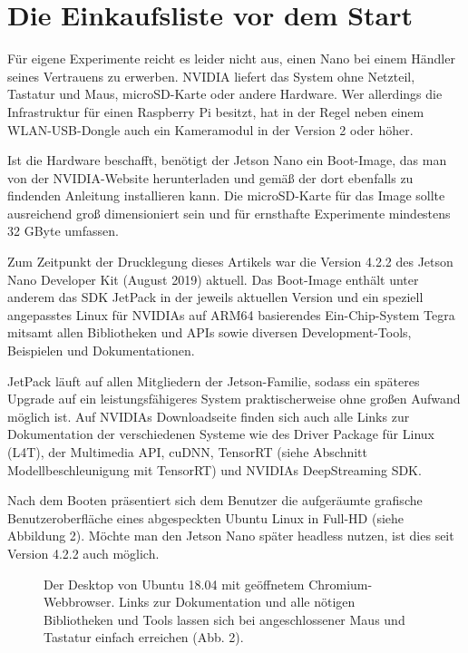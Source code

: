 \section{Die Einkaufsliste vor dem Start}

Für eigene Experimente reicht es leider nicht aus, einen Nano bei einem Händler seines Vertrauens zu erwerben. NVIDIA liefert das System ohne Netzteil, Tastatur und Maus, microSD-Karte oder andere Hardware. Wer allerdings die Infrastruktur für einen Raspberry Pi besitzt, hat in der Regel neben einem WLAN-USB-Dongle auch ein Kameramodul in der Version 2 oder höher. 

Ist die Hardware beschafft, benötigt der Jetson Nano ein Boot-Image, das man von der NVIDIA-Website herunterladen und gemäß der dort ebenfalls zu findenden Anleitung installieren kann. Die ­microSD-Karte für das Image sollte aus­reichend groß dimensioniert sein und für ernsthafte Experimente mindestens 32 GByte umfassen. 

Zum Zeitpunkt der Drucklegung dieses Artikels war die Version 4.2.2 des Jetson Nano Developer Kit (August 2019) aktuell. Das Boot-Image enthält unter anderem das SDK JetPack in der jeweils aktuellen Version und ein speziell angepasstes Linux für NVIDIAs auf ARM64 basierendes Ein-Chip-System Tegra mitsamt allen Bibliotheken und APIs sowie diversen Development-Tools, Beispielen und Dokumentationen. 

JetPack läuft auf allen Mitgliedern der Jetson-Familie, sodass ein späteres Upgrade auf ein leistungsfähigeres System praktischerweise ohne großen Aufwand möglich ist. Auf NVIDIAs Downloadseite finden sich auch alle Links zur Dokumentation der verschiedenen Systeme wie des Driver Package für Linux (L4T), der Multimedia API, cuDNN, TensorRT (siehe Abschnitt \glqq Modellbeschleunigung mit TensorRT\grqq) und NVIDIAs DeepStreaming SDK. 

Nach dem Booten präsentiert sich dem Benutzer die aufgeräumte grafische Benutzeroberfläche eines abgespeckten Ubuntu Linux in Full-HD (siehe Abbildung 2). Möchte man den Jetson Nano später \glqq head­less\grqq{} nutzen, ist dies seit Version 4.2.2 auch möglich. 

\begin{figure}
	
	\caption[Desktop von Ubuntu 18.04]{Der Desktop von Ubuntu 18.04 mit geöffnetem Chromium-Webbrowser. Links zur Dokumentation und alle nötigen Bibliotheken und Tools lassen sich bei angeschlossener Maus und Tastatur einfach erreichen (Abb. 2).}\label{fig:Zwerg:Abb2}
\end{figure}

